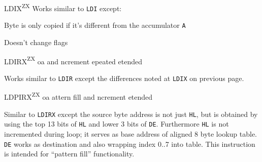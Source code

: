 \documentclass[12pt,twoside,openright,a4paper]{book}
\newcommand{\ZXN}{\textnormal{\textsuperscript{ZX}}}
\begin{document}
\begin{basedescript}{
	\desclabelstyle{\multilinelabel}
	\desclabelwidth{3cm}}
\begin{DetailItem}{LDIX\ZXN}
		Works similar to {\tt LDI} except:
		\begin{DetailCompactList}
			\item Byte is only copied if it's different from the accumulator {\tt A}
			\item Doesn't change flags
		\end{DetailCompactList}

		\DetailNoEffect
				
		\begin{DetailTiming}
		\end{DetailTiming}

	\end{DetailItem}

	\label{DetailRefLDIRX}
	\begin{DetailItem}{LDIRX\ZXN}
		{oa and ncrement epeated etended}		
		{\SymLDIRX}

		Works similar to {\tt LDIR} except the differences noted at {\tt LDIX} on previous page.

		\DetailNoEffect
				
		\begin{DetailTiming}
			\DetailTime{BC=0}{4}{16}
			\DetailTime{BC$\neq$0}{5}{21}
		\end{DetailTiming}

	\end{DetailItem}

	\label{DetailRefLDPIRX}
	\begin{DetailItem}{LDPIRX\ZXN}
		{oa attern fill and ncrement etended}
		{\SymLDPIRX}

		Similar to {\tt LDIRX} except the source byte address is not just {\tt HL}, but is obtained by using the top 13 bits of {\tt HL} and lower 3 bits of {\tt DE}. Furthermore {\tt HL} is not incremented during loop; it serves as base address of aligned 8 byte lookup table. {\tt DE} works as destination and also wrapping index 0..7 into table. This instruction is intended for ``pattern fill'' functionality.

		\DetailNoEffect
				
		\begin{DetailTiming}
		\end{DetailTiming}

	\end{DetailItem}



\end{basedescript}
\end{document}
